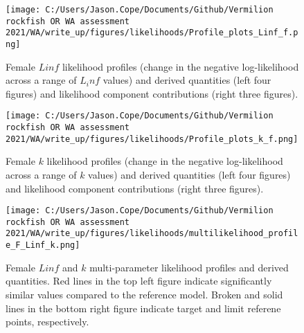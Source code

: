 \documentclass[11pt,
  english,
  a4paper,
]{article}
\begin{document}
\begin{figure}
\centering
\texttt{[image: C:/Users/Jason.Cope/Documents/Github/Vermilion rockfish OR WA assessment 2021/WA/write\_up/figures/likelihoods/Profile\_plots\_Linf\_f.png]}
\caption{Female {\(Linf\)\leavevmode\tagmcend\tagstructend} likelihood profiles (change in the negative log-likelihood across a range of {\(L_inf\)\leavevmode\tagmcend\tagstructend} values) and derived quantities (left four figures) and likelihood component contributions (right three figures).\label{fig:Linf_F-profile-combo}}
\end{figure}

\tagmcend\tagstructend


\begin{figure}
\centering
\texttt{[image: C:/Users/Jason.Cope/Documents/Github/Vermilion rockfish OR WA assessment 2021/WA/write\_up/figures/likelihoods/Profile\_plots\_k\_f.png]}
\caption{Female {\(k\)\leavevmode\tagmcend\tagstructend} likelihood profiles (change in the negative log-likelihood across a range of {\(k\)\leavevmode\tagmcend\tagstructend} values) and derived quantities (left four figures) and likelihood component contributions (right three figures).\label{fig:k_f-profile-combo}}
\end{figure}

\tagmcend\tagstructend


\begin{figure}
\centering
\texttt{[image: C:/Users/Jason.Cope/Documents/Github/Vermilion rockfish OR WA assessment 2021/WA/write\_up/figures/likelihoods/multilikelihood\_profile\_F\_Linf\_k.png]}
\caption{Female {\(Linf\)\leavevmode\tagmcend\tagstructend} and {\(k\)\leavevmode\tagmcend\tagstructend} multi-parameter likelihood profiles and derived quantities. Red lines in the top left figure indicate significantly similar values compared to the reference model. Broken and solid lines in the bottom right figure indicate target and limit referene points, respectively.\label{fig:Linf_k_f-profile}}
\end{figure}
\end{document}
